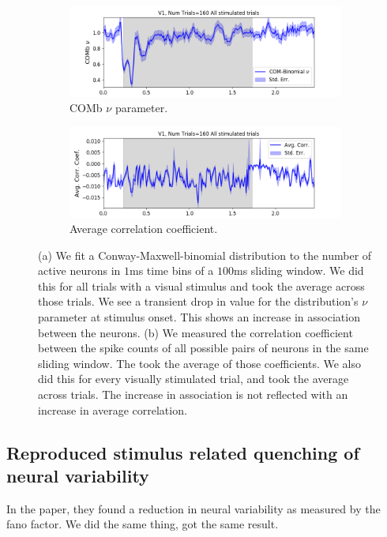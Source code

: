 \documentclass[a4paper,12pt]{article}
\theoremstyle{definition}
\begin{document}
  \newpage

  \begin{figure}[h]
    \begin{subfigure}[h]{\linewidth}
      \includegraphics[width=\linewidth]{figures/v1_1ms_comb_nu_all_stimulated_trials.png}
      \caption{COMb $\nu$ parameter.}
      \label{fig:comb_nu_parameter}
    \end{subfigure}
    \begin{subfigure}[h]{\linewidth}
      \includegraphics[width=\linewidth]{figures/v1_1ms_corr_avg_all_stimulated_trials.png}
      \caption{Average correlation coefficient.}
      \label{fig:avg_corr_coef}
    \end{subfigure}
    \caption{(a) We fit a Conway-Maxwell-binomial distribution to the number of active neurons in $1$ms time bins of a $100$ms sliding window. We did this for all trials with a visual stimulus and took the average across those trials. We see a transient drop in value for the distribution's $\nu$ parameter at stimulus onset. This shows an increase in association between the neurons. (b) We measured the correlation coefficient between the spike counts of all possible pairs of neurons in the same sliding window. The took the average of those coefficients. We also did this for every visually stimulated trial, and took the average across trials. The increase in association is not reflected with an increase in average correlation.}
    \label{fig:comb_nu_and_corr}
  \end{figure}

  \newpage

  \subsection{Reproduced stimulus related quenching of neural variability}
  In the paper, they found a reduction in neural variability as measured by the fano factor. We did the same thing, got the same result.
\end{document}
